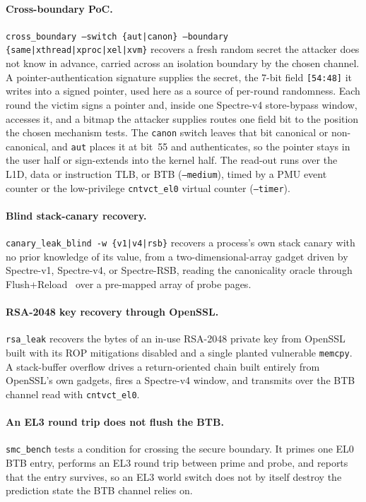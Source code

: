 \documentclass[letterpaper,twocolumn,10pt]{article}
\theoremstyle{definition}
\begin{document}
\paragraph{Cross-boundary PoC.} \texttt{cross\_boundary --switch \{aut|\allowbreak canon\}
--boundary \{same|\allowbreak xthread|\allowbreak xproc|\allowbreak xel|\allowbreak xvm\}} recovers a fresh random secret the attacker does not
know in advance, carried across an isolation boundary by the chosen channel. A
pointer-authentication signature supplies the secret, the 7-bit field \texttt{[54:48]} it writes
into a signed pointer, used here as a source of per-round randomness. Each round the victim signs
a pointer and, inside one Spectre-v4 store-bypass window, accesses it, and a bitmap the attacker
supplies routes one field bit to the position the chosen mechanism tests. The \texttt{canon} switch leaves that bit canonical or non-canonical, and
\texttt{aut} places it at bit~55 and authenticates, so the pointer stays in the user half or
sign-extends into the kernel half. The read-out runs over the L1D, data or instruction TLB, or
BTB (\texttt{--medium}), timed by a PMU event counter or the low-privilege \texttt{cntvct\_el0}
virtual counter (\texttt{--timer}).

\paragraph{Blind stack-canary recovery.} \texttt{canary\_leak\_blind -w \{v1|v4|rsb\}}
recovers a process's own stack canary with no prior knowledge of its value, from a
two-dimensional-array gadget driven by Spectre-v1, Spectre-v4, or Spectre-RSB, reading
the canonicality oracle through Flush+Reload~\cite{flushreload} over a pre-mapped array of
probe pages.

\paragraph{RSA-2048 key recovery through OpenSSL.} \texttt{rsa\_leak} recovers the bytes of
an in-use RSA-2048 private key from OpenSSL built with its ROP mitigations disabled and a
single planted vulnerable \texttt{memcpy}. A stack-buffer overflow drives a return-oriented chain built
entirely from OpenSSL's own gadgets, fires a Spectre-v4 window, and transmits over the BTB
channel read with \texttt{cntvct\_el0}.

\paragraph{An EL3 round trip does not flush the BTB.} \texttt{smc\_bench} tests a
condition for crossing the secure boundary. It primes one EL0 BTB entry, performs an
EL3 round trip between prime and probe, and reports that the entry survives, so an EL3
world switch does not by itself destroy the prediction state the BTB channel relies on.
\end{document}
